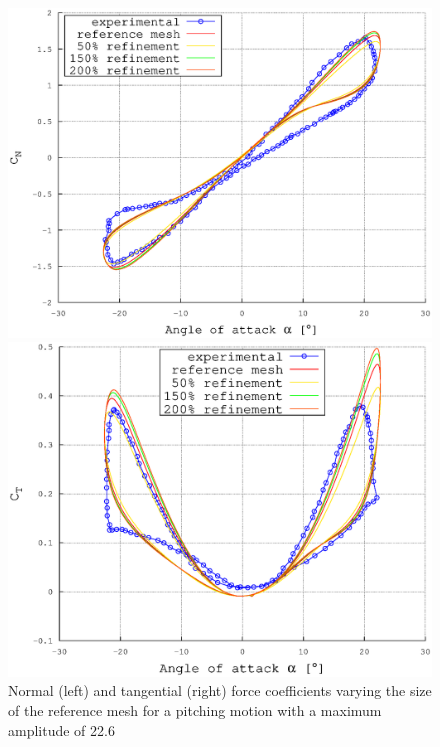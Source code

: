 \documentclass[a4paper]{jpconf}
\begin{document}
\begin{figure}[h]
\begin{minipage}{18pc}
\includegraphics[width=\columnwidth]{CNmesh.eps}
\end{minipage}\hspace{2pc}%
\begin{minipage}{18pc}
\includegraphics[width=\columnwidth]{CTmesh.eps}
\end{minipage} 
\caption{\label{figmesh}Normal (left) and tangential (right) force coefficients varying the size of the reference mesh for a pitching motion with a maximum amplitude of 22.6\degree\ }
\end{figure}
\end{document}
